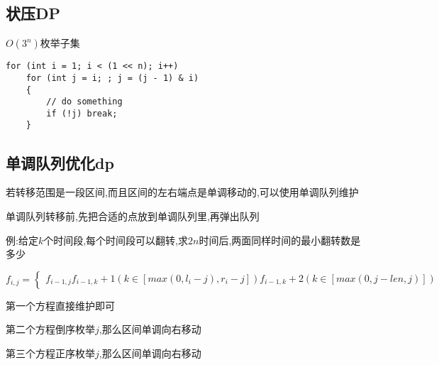 \documentclass[a4paper, fontset=none]{ctexart}
\begin{document}
\subsection{状压DP}

$O(3 ^ n)$枚举子集

\begin{verbatim}
for (int i = 1; i < (1 << n); i++)
    for (int j = i; ; j = (j - 1) & i)
    {
        // do something
        if (!j) break;
    }
\end{verbatim}
\subsection{单调队列优化dp}
若转移范围是一段区间,而且区间的左右端点是单调移动的,可以使用单调队列维护

单调队列转移前,先把合适的点放到单调队列里,再弹出队列

例:给定$k$个时间段,每个时间段可以翻转,求$2n$时间后,两面同样时间的最小翻转数是多少

\begin{equation}
f_{i, j}=\left\{
        \begin{array}{lr}
        f_{i-1, j}
        f_{i-1, k}+1(k\in[max(0, l_i-j), r_i-j])
        f_{i-1, k}+2(k\in[max(0, j-len, j)])
        \end{array}
\right.
\end{equation}

第一个方程直接维护即可

第二个方程倒序枚举$j$,那么区间单调向右移动

第三个方程正序枚举$j$,那么区间单调向右移动
\end{document}
